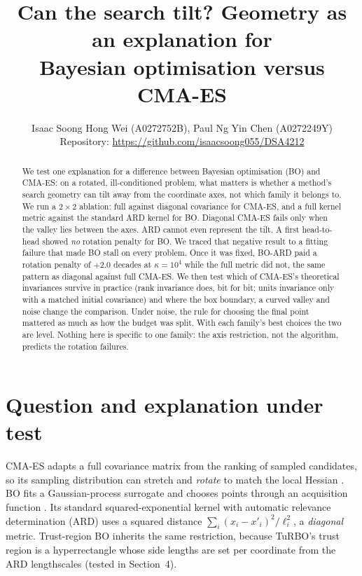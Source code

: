 \documentclass[10pt,a4paper]{article}
\title{\vspace{-1.2cm}Can the search tilt? Geometry as an explanation for\\
Bayesian optimisation versus CMA-ES\vspace{-0.3cm}}
\author{Isaac Soong Hong Wei (A0272752B), Paul Ng Yin Chen (A0272249Y)\\[2pt]
\small Repository: \url{https://github.com/isaacsoong055/DSA4212}}
\date{\vspace{-0.6cm}}
\begin{document}
\maketitle

\begin{abstract}
\noindent
We test one explanation for a difference between Bayesian optimisation (BO) and CMA-ES: on a rotated,
ill-conditioned problem, what matters is whether a method's search geometry can tilt away from the
coordinate axes, not which family it belongs to. We run a $2\times2$ ablation: full against diagonal
covariance for CMA-ES, and a full kernel metric against the standard ARD kernel for BO. Diagonal CMA-ES
fails only when the valley lies between the axes. ARD cannot even represent the tilt. A first
head-to-head showed \emph{no} rotation penalty for BO. We traced that negative result to a fitting failure
that made BO stall on every problem. Once it was fixed, BO-ARD paid a rotation penalty of $+2.0$ decades
at $\kappa=10^4$ while the full metric did not, the same pattern as diagonal against full CMA-ES. We then
test which of CMA-ES's theoretical invariances survive in practice (rank invariance does, bit for bit;
units invariance only with a matched initial covariance) and where the box boundary, a curved valley and
noise change the comparison. Under noise, the rule for choosing the final point mattered as much as how
the budget was split. With each family's best choices the two are level. Nothing here is specific to one family: the axis restriction, not the
algorithm, predicts the rotation failures.
\end{abstract}

\section{Question and explanation under test}
CMA-ES adapts a full covariance matrix from the ranking of sampled candidates, so its sampling
distribution can stretch and \emph{rotate} to match the local Hessian \citep{hansen2016tutorial}. BO fits
a Gaussian-process surrogate and chooses points through an acquisition function \citep{frazier2018tutorial}.
Its standard squared-exponential kernel with automatic relevance determination (ARD) uses a squared
distance $\sum_i (x_i-x'_i)^2/\ell_i^2$, a \emph{diagonal} metric. Trust-region BO inherits the same
restriction, because TuRBO's trust region is a hyperrectangle whose side lengths are set per coordinate
from the ARD lengthscales \citep{eriksson2019turbo} (tested in Section~4).
\end{document}
